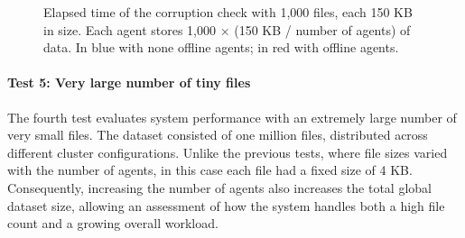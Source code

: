 \begin{figure}[!ht]
\centering
{}
\caption{Elapsed time of the corruption check with 1,000 files, each 150 KB in
    size. Each agent stores 1,000 $\times$ (150 KB / number of agents) of data. In blue with none offline agents; in red with offline
    agents.}
\label{fig:test-3}
\end{figure}

\newpage
\paragraph{Test 5: Very large number of tiny files}

The fourth test evaluates system performance with an extremely large number of very small files. The dataset consisted of one million files, distributed across different cluster configurations. Unlike the previous tests, where file sizes varied with the number of agents, in this case each file had a fixed size of 4 KB. Consequently, increasing the number of agents also increases the total global dataset size, allowing an assessment of how the system handles both a high file count and a growing overall workload.


